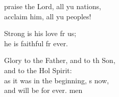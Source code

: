 \settowidth{\versewidth}{Glory to the Father, and to the Son, *}
\begin{psalmverse}%
  \begin{patverse}
     praise the Lord, all yu nations,\Med\\
acclaim him, all yu peoples!

Strong is his love fr us;\Med\\
he is faithful fr ever.

Glory to the Father, and to th Son,\Med\\
and to the Hol Spirit:\\
as it was in the beginning, \pointup{\i}s now,\Med\\
and will be for ever. men
  \end{patverse}
\end{psalmverse}
